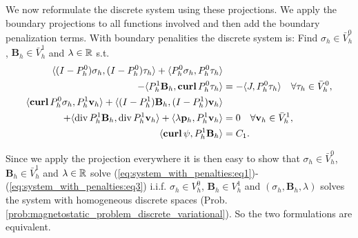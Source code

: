 \documentclass[../master_thesis.tex]{subfiles}
\begin{document}
We now reformulate the discrete system using these projections. We apply the boundary projections 
to all functions involved and then add the boundary penalization terms.
With boundary penalities the discrete system is: Find $\sigma_h \in \bar{V}_h^0$, 
$\mathbf{B}_h \in \bar{V}^1_h$ and $\lambda \in \mathbb{R}$ s.t.
\begin{align}
    \langle (I-P^0_h)\sigma_h, (I-P^0_h)\tau_h \rangle 
    + \langle P^0_h \sigma_h, P^0_h\tau_h \rangle& \notag
    \\- \langle P^1_h \mathbf{B}_h,\veccurl P^0_h\tau_h \rangle 
    &=  -\langle J, P^0_h \tau_h \rangle \quad \forall \tau_h \in \bar{V}_h^0, \label{eq:system_with_penalties:eq1}
    \\ \langle \veccurl P^0_h \sigma_h, P^1_h\mathbf{v}_h \rangle 
        + \langle (I-P^1_h)\mathbf{B}_h, (I-P^1_h)\mathbf{v}_h \rangle& \notag
      \\+ \langle \diver P^1_h\mathbf{B}_h, \diver P^1_h\mathbf{v}_h \rangle 
         + \langle \lambda \mathbf{p}_h, P^1_h\mathbf{v}_h \rangle 
    &= 0 \quad \forall \mathbf{v}_h \in \bar{V}^1_h, \label{eq:system_with_penalties:eq2}
    \\ \langle \bm{\curl} \psi, P^1_h \mathbf{B}_h \rangle &= C_1 .
        \label{eq:system_with_penalties:eq3}
\end{align}

Since we apply the projection everywhere it is then easy to show that 
$\sigma_h \in \bar{V}_h^0$, 
$\mathbf{B}_h \in \bar{V}^1_h$ and $\lambda \in \mathbb{R}$ solve 
(\ref{eq:system_with_penalties:eq1})-(\ref{eq:system_with_penalties:eq3})
i.i.f. $\sigma_h \in V_h^0$, $\mathbf{B}_h \in V^1_h$ 
and $(\sigma_h,\mathbf{B}_h,\lambda)$ solves the system with homogeneous discrete spaces 
(Prob.\,\ref{prob:magnetostatic_problem_discrete_variational}). 
So the two formulations are equivalent.
\end{document}
